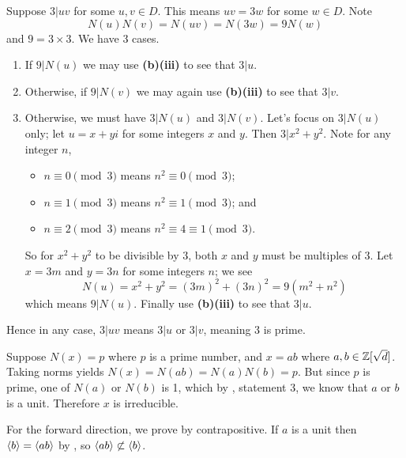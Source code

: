 \begin{questions}
\begin{partquestions}{\alph*}
\begin{partquestions}{\roman*}
            \item Suppose $3 \vert uv$ for some $u,v\in D$. This means $uv = 3w$ for some $w \in D$. Note
            \[
                N(u)N(v) = N(uv) = N(3w) = 9N(w)
            \]
            and $9 = 3\times3$. We have 3 cases.
            \begin{enumerate}[label=\arabic*.]
                \item If $9 \vert N(u)$ we may use \textbf{(b)(iii)} to see that $3 \vert u$.
                \item Otherwise, if $9 \vert N(v)$ we may again use \textbf{(b)(iii)} to see that $3 \vert v$.
                \item Otherwise, we must have $3 \vert N(u)$ and $3 \vert N(v)$. Let's focus on $3 \vert N(u)$ only; let $u = x+yi$ for some integers $x$ and $y$. Then $3 \vert x^2+y^2$. Note for any integer $n$,
                \begin{itemize}
                    \item $n \equiv 0 \pmod3$ means $n^2 \equiv 0 \pmod3$;
                    \item $n \equiv 1 \pmod3$ means $n^2 \equiv 1 \pmod3$; and
                    \item $n \equiv 2 \pmod3$ means $n^2 \equiv 4 \equiv 1 \pmod3$.
                \end{itemize}
                So for $x^2+y^2$ to be divisible by 3, both $x$ and $y$ must be multiples of 3. Let $x = 3m$ and $y = 3n$ for some integers $n$; we see
                \[
                    N(u) = x^2+y^2 = (3m)^2 + (3n)^2 = 9(m^2+n^2)
                \]
                which means $9 \vert N(u)$. Finally use \textbf{(b)(iii)} to see that $3 \vert u$.
            \end{enumerate}
            Hence in any case, $3 \vert uv$ means $3 \vert u$ or $3 \vert v$, meaning 3 is prime.
        \end{partquestions}
    \end{partquestions}

    \item Suppose $N(x) = p$ where $p$ is a prime number, and $x = ab$ where $a,b \in \mathbb{Z}[\sqrt{d}]$. Taking norms yields $N(x) = N(ab) = N(a)N(b) = p$. But since $p$ is prime, one of $N(a)$ or $N(b)$ is 1, which by , statement 3, we know that $a$ or $b$ is a unit. Therefore $x$ is irreducible.
    
    \item For the forward direction, we prove by contrapositive. If $a$ is a unit then $\left\langle b\right\rangle = \left\langle ab\right\rangle$ by , so $\left\langle ab\right\rangle \not\subset \left\langle b\right\rangle$.
    

\end{questions}
